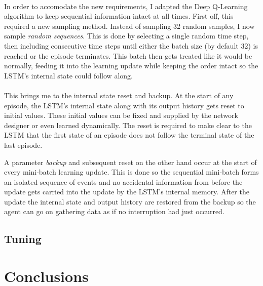 \paragraph{}
In order to accomodate the new requirements,
I adapted the Deep Q-Learning algorithm
to keep sequential information intact at all times.
First off,
this required a new sampling method.
Instead of sampling 32 random samples,
I now sample \textit{random sequences}.
This is done by selecting a single random time step,
then including consecutive time steps
until either the batch size (by default 32)
is reached or the episode terminates.
This batch then gets treated like it would be normally,
feeding it into the learning update while keeping the order intact
so the LSTM's internal state could follow along.

\paragraph{}
This brings me to the internal state reset and backup.
At the start of any episode,
the LSTM's internal state along with its output history
gets reset to initial values.
These initial values can be fixed and supplied
by the network designer
or even learned dynamically.
The reset is required to make clear to the LSTM
that the first state of an episode
does not follow the terminal state of the last episode.

A parameter \textit{backup} and subsequent reset
on the other hand
occur at the start of every mini-batch learning update.
This is done so the sequential mini-batch
forms an isolated sequence of events
and no accidental information from before the update gets carried into the update
by the LSTM's internal memory.
After the update
the internal state and output history
are restored from the backup
so the agent can go on gathering data
as if no interruption had just occurred.

\subsection{Tuning}
\label{sub:lstm_tuning}



\section{Conclusions}
\label{sec:conclusions}


